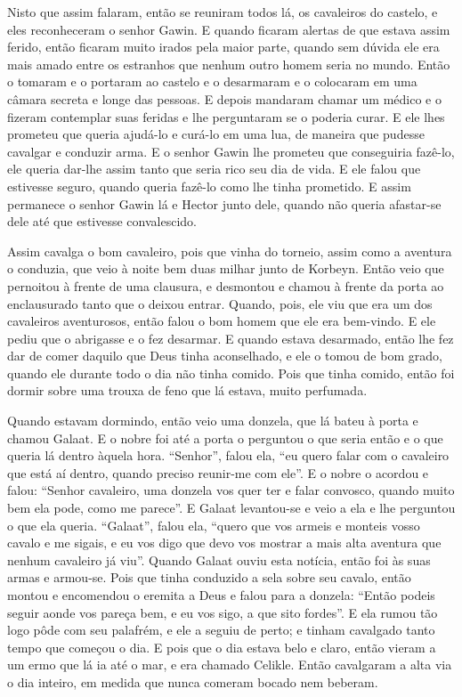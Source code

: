 Nisto que assim falaram, então se reuniram todos lá, os cavaleiros do castelo, e
eles reconheceram o senhor Gawin. E quando ficaram alertas de que estava assim
ferido, então ficaram muito irados pela maior parte, quando sem dúvida ele era
mais amado entre os estranhos que nenhum outro homem seria no mundo. Então o
tomaram e o portaram ao castelo e o desarmaram e o colocaram em uma câmara
secreta e longe das pessoas. E depois mandaram chamar um médico e o fizeram
contemplar suas feridas e lhe perguntaram se o poderia curar. E ele lhes
prometeu que queria ajudá-lo e curá-lo em uma lua, de maneira que pudesse
cavalgar e conduzir arma. E o senhor Gawin lhe prometeu que conseguiria
fazê-lo, ele queria dar-lhe assim tanto que seria rico seu dia de vida. E ele
falou que estivesse seguro, quando queria fazê-lo como lhe tinha prometido. E
assim permanece o senhor Gawin lá e Hector junto dele, quando não queria
afastar-se dele até que estivesse convalescido.

Assim cavalga o bom cavaleiro, pois que vinha do torneio, assim como a aventura
o conduzia, que veio à noite bem duas milhar junto de Korbeyn. Então veio que
pernoitou à frente de uma clausura, e desmontou e chamou à frente da porta ao
enclausurado tanto que o deixou entrar. Quando, pois, ele viu que era um dos
cavaleiros aventurosos, então falou o bom homem que ele era bem-vindo. E ele
pediu que o abrigasse e o fez desarmar. E quando estava desarmado, então lhe
fez dar de comer daquilo que Deus tinha aconselhado, e ele o tomou de bom
grado, quando ele durante todo o dia não tinha comido. Pois que tinha comido,
então foi dormir sobre uma trouxa de feno que lá estava, muito perfumada. 

Quando estavam dormindo, então veio uma donzela, que lá bateu à porta e chamou
Galaat. E o nobre foi até a porta o perguntou o que seria então e o que queria
lá dentro àquela hora. “Senhor”, falou ela, “eu quero falar com o cavaleiro que
está aí dentro, quando preciso reunir-me com ele”. E o nobre o acordou e falou:
“Senhor cavaleiro, uma donzela vos quer ter e falar convosco, quando muito bem
ela pode, como me parece”. E Galaat levantou-se e veio a ela e lhe perguntou o
que ela queria. “Galaat”, falou ela, “quero que vos armeis e monteis vosso
cavalo e me sigais, e eu vos digo que devo vos mostrar a mais alta aventura que
nenhum cavaleiro já viu”. Quando Galaat ouviu esta notícia, então foi às suas
armas e armou-se. Pois que tinha conduzido a sela sobre seu cavalo, então
montou e encomendou o eremita a Deus e falou para a donzela: “Então podeis
seguir aonde vos pareça bem, e eu vos sigo, a que sito fordes”. E ela rumou tão
logo pôde com seu palafrém, e ele a seguiu de perto; e tinham cavalgado tanto
tempo que começou o dia. E pois que o dia estava belo e claro, então vieram a
um ermo que lá ia até o mar, e era chamado Celikle. Então cavalgaram a alta via
o dia inteiro, em medida que nunca comeram bocado nem beberam. 

